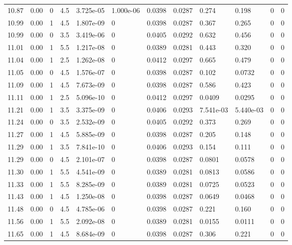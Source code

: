 \documentclass[preview]{standalone}
\begin{document}
{{{{{{{{\begin{tabular}{L{1.2cm}C{1.2cm} C{0.3cm}C{0.5cm} C{1.4cm}C{1.4cm} C{1.4cm}C{1.4cm} C{1.6cm}C{1.6cm} C{1.6cm}C{1.6cm}}
  10.87  &  0.00  & 0     & 4.5 &  3.725e-05  & 1.000e-06  &  0.0398&   0.0287& 0.274 & 0.198   &  0 & 0  \\ 
  10.99  &  0.00  & 1     & 4.5 &  1.807e-09  & 0  &  0.0398&   0.0287& 0.367 & 0.265   &  0 & 0  \\ 
  10.99  &  0.00  & 0     & 3.5 &  3.419e-06  & 0  &  0.0405&   0.0292& 0.632 & 0.456   &  0 & 0  \\ 
  11.01  &  0.00  & 1     & 5.5 &  1.217e-08  & 0  &  0.0389&   0.0281& 0.443 & 0.320   &  0 & 0  \\ 
  11.04  &  0.00  & 1     & 2.5 &  1.262e-08  & 0  &  0.0412&   0.0297& 0.665 & 0.479   &  0 & 0  \\ 
  11.05  &  0.00  & 0     & 4.5 &  1.576e-07  & 0  &  0.0398&   0.0287& 0.102 & 0.0732   &  0 & 0  \\ 
  11.09  &  0.00  & 1     & 4.5 &  7.673e-09  & 0  &  0.0398&   0.0287& 0.586 & 0.423   &  0 & 0  \\ 
  11.11  &  0.00  & 1     & 2.5 &  5.096e-10  & 0  &  0.0412&   0.0297& 0.0409 & 0.0295   &  0 & 0  \\ 
  11.21  &  0.00  & 1     & 3.5 &  3.375e-09  & 0  &  0.0406&   0.0293& 7.541e-03 & 5.440e-03   &  0 & 0  \\ 
  11.24  &  0.00  & 0     & 3.5 &  2.532e-09  & 0  &  0.0405&   0.0292& 0.373 & 0.269   &  0 & 0  \\ 
  11.27  &  0.00  & 1     & 4.5 &  5.885e-09  & 0  &  0.0398&   0.0287& 0.205 & 0.148   &  0 & 0  \\ 
  11.29  &  0.00  & 1     & 3.5 &  7.841e-10  & 0  &  0.0406&   0.0293& 0.154 & 0.111   &  0 & 0  \\ 
  11.29  &  0.00  & 0     & 4.5 &  2.101e-07  & 0  &  0.0398&   0.0287& 0.0801 & 0.0578   &  0 & 0  \\ 
  11.30  &  0.00  & 1     & 5.5 &  4.541e-09  & 0  &  0.0389&   0.0281& 0.0813 & 0.0586   &  0 & 0  \\ 
  11.33  &  0.00  & 1     & 5.5 &  8.285e-09  & 0  &  0.0389&   0.0281& 0.0725 & 0.0523   &  0 & 0  \\ 
  11.43  &  0.00  & 1     & 4.5 &  1.250e-08  & 0  &  0.0398&   0.0287& 0.0649 & 0.0468   &  0 & 0  \\ 
  11.48  &  0.00  & 0     & 4.5 &  4.785e-06  & 0  &  0.0398&   0.0287& 0.221 & 0.160   &  0 & 0  \\ 
  11.56  &  0.00  & 1     & 5.5 &  2.092e-08  & 0  &  0.0389&   0.0281& 0.0155 & 0.0111   &  0 & 0  \\ 
  11.65  &  0.00  & 1     & 4.5 &  8.684e-09  & 0  &  0.0398&   0.0287& 0.306 & 0.221   &  0 & 0  \\ 

\end{tabular}}}}}}}}}
\end{document}
